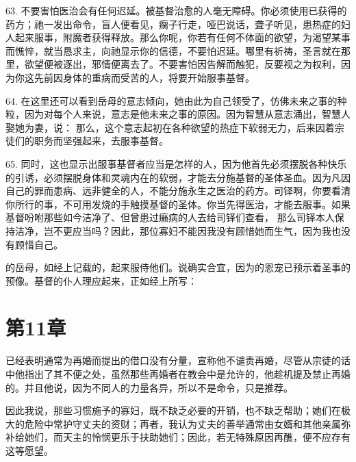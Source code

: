 63. 不要害怕医治会有任何迟延。被基督治愈的人毫无障碍。你必须使用已获得的药方；祂一发出命令，盲人便看见，瘸子行走，哑巴说话，聋子听见，患热症的妇人起来服事，附魔者获得释放。那么你呢，你若有任何不体面的欲望，为渴望某事而憔悴，就当恳求主，向祂显示你的信德，不要怕迟延。哪里有祈祷，圣言就在那里，欲望便被逐出，邪情便离去了。不要害怕因告解而触犯，反要视之为权利，因为你这先前因身体的重病而受苦的人，将要开始服事基督。\par

64. 在这里还可以看到岳母的意志倾向，她由此为自己领受了，仿佛未来之事的种粒，因为对每个人来说，意志是他未来之事的原因。因为智慧从意志涌出，智慧人娶她为妻，说： 那么，这个意志起初在各种欲望的热症下软弱无力，后来因着宗徒们的职务而坚强起来，去服事基督。\par

65. 同时，这也显示出服事基督者应当是怎样的人，因为他首先必须摆脱各种快乐的引诱，必须摆脱身体和灵魂内在的软弱，才能去分施基督的圣体圣血。因为凡因自己的罪而患病、远非健全的人，不能分施永生之医治的药方。司铎啊，你要看清你所行的事，不可用发烧的手触摸基督的圣体。你当先得医治，才能去服事。如果基督吩咐那些如今洁净了、但曾患过癞病的人去给司铎们查看， 那么司铎本人保持洁净，岂不更应当吗？因此，那位寡妇不能因我没有顾惜她而生气，因为我也没有顾惜自己。\par

的岳母，如经上记载的，起来服侍他们。说确实合宜，因为的恩宠已预示着圣事的预像。基督的仆人理应起来，正如经上所写： \par


\section{第11章}

已经表明通常为再婚而提出的借口没有分量，宣称他不谴责再婚，尽管从宗徒的话中他指出了其不便之处，虽然那些再婚者在教会中是允许的，他趁机提及禁止再婚的。并且他说，因为不同人的力量各异，所以不是命令，只是推荐。\par

因此我说，那些习惯施予的寡妇，既不缺乏必要的开销，也不缺乏帮助；她们在极大的危险中常护守丈夫的资财；再者，我认为丈夫的善举通常由女婿和其他亲属弥补给她们，而天主的怜悯更乐于扶助她们；因此，若无特殊原因再醮，便不应存有这等愿望。\par

